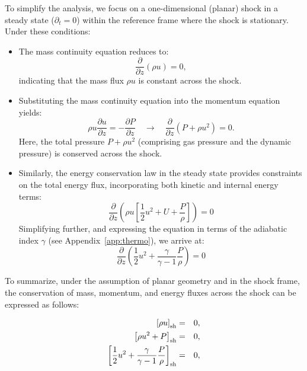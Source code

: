 To simplify the analysis, we focus on a one-dimensional (planar) shock in a steady state (\( \partial_t = 0 \)) within the reference frame where the shock is stationary. 
%
Under these conditions:
\begin{itemize}
\item The mass continuity equation reduces to:
   \begin{equation}
   \frac{\partial}{\partial z} (\rho u) = 0,
   \end{equation}
   indicating that the mass flux \( \rho u \) is constant across the shock.

\item Substituting the mass continuity equation into the momentum equation yields:
\begin{equation}
\rho u \frac{\partial u}{\partial z} = -\frac{\partial P}{\partial z} \quad \rightarrow \quad \frac{\partial}{\partial z} (P + \rho u^2) = 0.
\end{equation}
Here, the total pressure \( P + \rho u^2 \) (comprising gas pressure and the dynamic pressure) is conserved across the shock.

\item Similarly, the energy conservation law in the steady state provides constraints on the total energy flux, incorporating both kinetic and internal energy terms:
%
\begin{equation}
\frac{\partial}{\partial z} \left( \rho u \left[ \frac{1}{2} u^2 + U + \frac{P}{\rho} \right] \right) = 0 
\end{equation}
%
Simplifying further, and expressing the equation in terms of the adiabatic index \( \gamma \) (see Appendix~\ref{app:thermo}), we arrive at:
%
\begin{equation}
\frac{\partial}{\partial z} \left( \frac{1}{2} u^2 + \frac{\gamma}{\gamma - 1}\frac{P}{\rho} \right) = 0 
\end{equation}
\end{itemize}

%

To summarize, under the assumption of planar geometry and in the shock frame, the conservation of mass, momentum, and energy fluxes across the shock can be expressed as follows:

\begin{remark}
\begin{eqnarray}
\left[ \rho u \right]_{\rm sh} & = & 0, \label{eq:RH1} \\
\left[ \rho u^2 + P \right]_{\rm sh} & = & 0, \label{eq:RH2} \\
\left[ \frac{1}{2} u^2 + \frac{\gamma}{\gamma - 1} \frac{P}{\rho} \right]_{\rm sh} & = & 0, \label{eq:RH3}
\end{eqnarray}
\end{remark}

